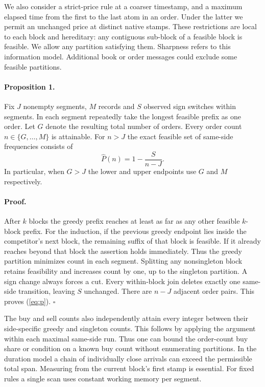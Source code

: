 \documentclass[11pt]{article}
\newcommand{\Prs}{\widehat P}
\begin{document}
We also consider a strict-price rule at a coarser timestamp, and a maximum elapsed time from the first to the last atom in an order. Under the latter we permit an unchanged price at distinct native stamps. These restrictions are local to each block and hereditary: any contiguous sub-block of a feasible block is feasible. We allow any partition satisfying them. Sharpness refers to this information model. Additional book or order messages could exclude some feasible partitions.

\paragraph{Proposition 1.}
Fix $J$ nonempty segments, $M$ records and $S$ observed sign switches within segments. In each segment repeatedly take the longest feasible prefix as one order. Let $G$ denote the resulting total number of orders. Every order count $n\in\{G,\ldots,M\}$ is attainable. For $n>J$ the exact feasible set of same-side frequencies consists of
\begin{equation}
       \Prs(n)=1-\frac{S}{n-J}. \label{eq:p}
\end{equation}
In particular, when $G>J$ the lower and upper endpoints use $G$ and $M$ respectively.

\paragraph{Proof.}
After $k$ blocks the greedy prefix reaches at least as far as any other feasible $k$-block prefix. For the induction, if the previous greedy endpoint lies inside the competitor's next block, the remaining suffix of that block is feasible. If it already reaches beyond that block the assertion holds immediately. Thus the greedy partition minimizes count in each segment. Splitting any nonsingleton block retains feasibility and increases count by one, up to the singleton partition. A sign change always forces a cut. Every within-block join deletes exactly one same-side transition, leaving $S$ unchanged. There are $n-J$ adjacent order pairs. This proves (\ref{eq:p}). \hfill$\square$

The buy and sell counts also independently attain every integer between their side-specific greedy and singleton counts. This follows by applying the argument within each maximal same-side run. Thus one can bound the order-count buy share or condition on a known buy count without enumerating partitions. In the duration model a chain of individually close arrivals can exceed the permissible total span. Measuring from the current block's first stamp is essential. For fixed rules a single scan uses constant working memory per segment.
\end{document}
